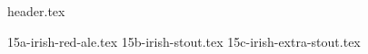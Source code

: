 \clearpage
{}
\divisorLine
{header.tex}
\begin{multicols}{2}
{15a-irish-red-ale.tex}
{15b-irish-stout.tex}
{15c-irish-extra-stout.tex}
\end{multicols}